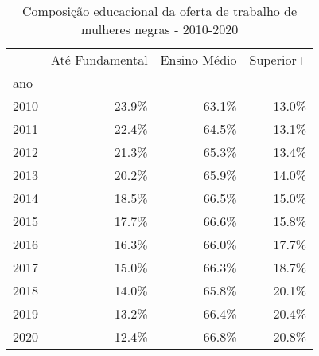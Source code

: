 \begin{table}[htb!]
\centering
\caption{Composição educacional da oferta de trabalho de mulheres negras - 2010-2020}
\begin{tabular}{lrrr}
\toprule
{} &  Até Fundamental &  Ensino Médio &  Superior+ \\
ano  &                  &               &            \\
\midrule
2010 &            23.9\% &         63.1\% &      13.0\% \\
2011 &            22.4\% &         64.5\% &      13.1\% \\
2012 &            21.3\% &         65.3\% &      13.4\% \\
2013 &            20.2\% &         65.9\% &      14.0\% \\
2014 &            18.5\% &         66.5\% &      15.0\% \\
2015 &            17.7\% &         66.6\% &      15.8\% \\
2016 &            16.3\% &         66.0\% &      17.7\% \\
2017 &            15.0\% &         66.3\% &      18.7\% \\
2018 &            14.0\% &         65.8\% &      20.1\% \\
2019 &            13.2\% &         66.4\% &      20.4\% \\
2020 &            12.4\% &         66.8\% &      20.8\% \\
\bottomrule
\end{tabular}
\end{table}
